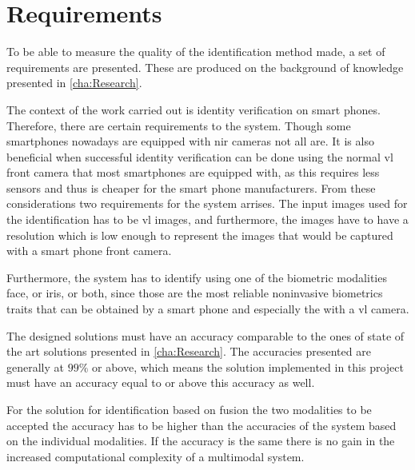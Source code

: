 \chapter{Requirements}\label{ch:req}
To be able to measure the quality of the identification method made, a set of requirements are presented. These are produced on the background of knowledge presented in \autoref{cha:Research}.

The context of the work carried out is identity verification on smart phones. Therefore, there are certain requirements to the system. Though some smartphones nowadays are equipped with \gls{nir} cameras not all are. It is also beneficial when successful identity verification can be done using the normal \gls{vl} front camera that most smartphones are equipped with, as this requires less sensors and thus is cheaper for the smart phone manufacturers. From these considerations two requirements for the system arrises. The input images used for the identification has to be \gls{vl} images, and furthermore, the images have to have a resolution which is low enough to represent the images that would be captured with a smart phone front camera.

Furthermore, the system has to identify using one of the biometric modalities face, or iris, or both, since those are the most reliable noninvasive biometrics traits that can be obtained by a smart phone and especially the with a \gls{vl} camera. 

The designed solutions must have an accuracy comparable to the ones of state of the art solutions presented in \autoref{cha:Research}. The accuracies presented are generally at $99\%$ or above, which means the solution implemented in this project must have an accuracy equal to or above this accuracy as well. 

For the solution for identification based on fusion the two modalities to be accepted the accuracy has to be higher than the accuracies of the system based on the individual modalities. If the accuracy is the same there is no gain in the increased computational complexity of a multimodal system. 

